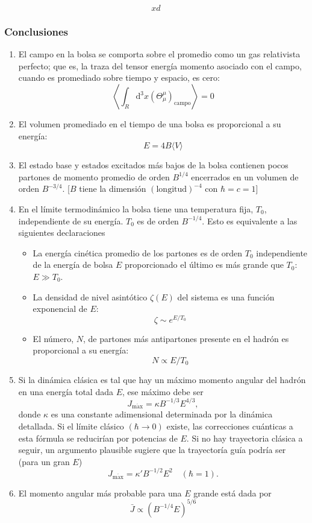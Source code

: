 \begin{equation}
xd
\end{equation}


\subsubsection*{Conclusiones}

\begin{enumerate}

\item El campo en la bolsa se comporta sobre el promedio como un gas relativista perfecto; que es, la traza del tensor energía momento asociado con el campo, cuando es promediado sobre tiempo y espacio, es cero:
\begin{equation}
\left\langle \int_{R} {\mathrm{d}}^{3} x ({\Theta}_{\mu}^{\mu})_{\mathrm{campo}} \right\rangle = 0
\end{equation}
\item El volumen promediado en el tiempo de una bolsa es proporcional a su energía:
\begin{equation}
E = 4B \langle V \rangle
\end{equation}
\item El estado base y estados excitados más bajos de la bolsa contienen pocos partones de momento promedio de orden ${B}^{1/4}$ encerrados en un volumen de orden ${B}^{-3/4}$. [$B$ tiene la dimensión $(\mathrm{longitud})^{-4}$ con $\hbar=c=1$]
\item En el límite termodinámico la bolsa tiene una temperatura fija, ${T}_{0}$, independiente de su energía. ${T}_{0}$ es de orden ${B}^{-1/4}$. Esto es equivalente a las siguientes declaraciones
\begin{itemize}
\item La energía cinética promedio de los partones es de orden ${T}_{0}$ independiente de la energía de bolsa $E$ proporcionado el último es más grande que ${T}_{0}$: ${E} \gg {T}_{0}$.
\item La densidad de nivel asintótico ${\zeta(E)}$ del sistema es una función exponencial de $E$:
\[
\zeta \sim {e}^{E/{T}_{0}}
\]
\item El número, $N$, de partones más antipartones presente en el hadrón es proporcional a su energía:
\[
N \propto E/{T}_{0}
\]
\end{itemize}
\item Si la dinámica clásica es tal que hay un máximo momento angular del hadrón en una energía total dada $E$, ese máximo debe ser 
\[
{J}_{\mathrm{m\acute{a}x}} = \kappa {B}^{-1/3} {E}^{4 / 3},
\]
donde ${\kappa}$ es una constante adimensional determinada por la dinámica detallada. Si el límite clásico $({\hbar} \rightarrow 0)$ existe, las correcciones cuánticas a esta fórmula se reducirían por potencias de $E$. Si no hay trayectoria clásica a seguir, un argumento plausible sugiere que la trayectoría guía podría ser (para un gran $E$)
\[
{J}_{\mathrm{m\acute{a}x}} = {\kappa}' {B}^{-1/2} {E}^{2} \quad ({\hbar = 1}).
\]
\item El momento angular más probable para una $E$ grande está dada por 
\[
\bar{J} \propto ({B}^{-1/4} E)^{5/6}
\]
\end{enumerate}

